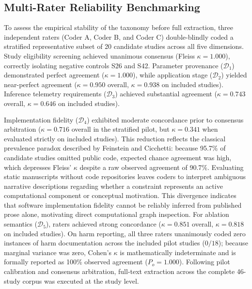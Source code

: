 \subsection{Multi-Rater Reliability Benchmarking}
To assess the empirical stability of the taxonomy before full extraction, three independent raters (Coder A, Coder B, and Coder C) double-blindly coded a stratified representative subset of 20 candidate studies across all five dimensions. Study eligibility screening achieved unanimous consensus (Fleiss $\kappa = 1.000$), correctly isolating negative controls S26 and S42. Parameter provenance ($\mathcal{D}_1$) demonstrated perfect agreement ($\kappa = 1.000$), while application stage ($\mathcal{D}_2$) yielded near-perfect agreement ($\kappa = 0.950$ overall, $\kappa = 0.938$ on included studies). Inference telemetry requirements ($\mathcal{D}_3$) achieved substantial agreement ($\kappa = 0.743$ overall, $\kappa = 0.646$ on included studies).

Implementation fidelity ($\mathcal{D}_4$) exhibited moderate concordance prior to consensus arbitration ($\kappa = 0.716$ overall in the stratified pilot, but $\kappa = 0.341$ when evaluated strictly on included studies). This reduction reflects the classical prevalence paradox described by Feinstein and Cicchetti: because 95.7\% of candidate studies omitted public code, expected chance agreement was high, which depresses Fleiss' $\kappa$ despite a raw observed agreement of 90.7\%. Evaluating static manuscripts without code repositories leaves coders to interpret ambiguous narrative descriptions regarding whether a constraint represents an active computational component or conceptual motivation. This divergence indicates that software implementation fidelity cannot be reliably inferred from published prose alone, motivating direct computational graph inspection. For ablation semantics ($\mathcal{D}_5$), raters achieved strong concordance ($\kappa = 0.851$ overall, $\kappa = 0.818$ on included studies). On harm reporting, all three raters unanimously coded zero instances of harm documentation across the included pilot studies ($0/18$); because marginal variance was zero, Cohen's $\kappa$ is mathematically indeterminate and is formally reported as 100\% observed agreement ($P_o = 1.000$). Following pilot calibration and consensus arbitration, full-text extraction across the complete 46-study corpus was executed at the study level.

